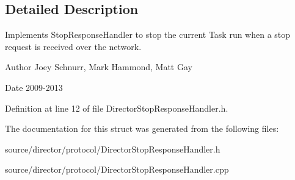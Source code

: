 \subsection{Detailed Description}
Implements Stop\-Response\-Handler to stop the current Task run when a stop request is received over the network. 

\begin{DoxyAuthor}{Author}
Joey Schnurr, Mark Hammond, Matt Gay 
\end{DoxyAuthor}
\begin{DoxyDate}{Date}
2009-\/2013 
\end{DoxyDate}


Definition at line 12 of file Director\-Stop\-Response\-Handler.\-h.



The documentation for this struct was generated from the following files\-:\begin{DoxyCompactItemize}
\item 
source/director/protocol/Director\-Stop\-Response\-Handler.\-h\item 
source/director/protocol/Director\-Stop\-Response\-Handler.\-cpp\end{DoxyCompactItemize}
